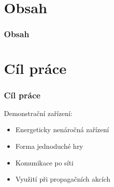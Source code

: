 \documentclass{beamer}
\author[\FirstNameAbbreviated. \LastName]{\FirstName{} \LastName \\ {\color{mygray}\Email}}
\title{\DissertationTitle}
\institute[\FacultyAndUniversityAbbr]{\Department\\ \Faculty\\ \University \\[1em]}
\date{\today}
\begin{document}
{
\beamertemplatenavigationsymbolsempty
\begin{frame}[plain]
\maketitle
\end{frame}
\addtocounter{framenumber}{-1}
}
%
\section*{Obsah}
\begin{frame}[allowframebreaks]
\frametitle{Obsah}
\tableofcontents
\end{frame}

\section{Cíl práce}
\begin{frame}
\frametitle{Cíl práce}
Demonstrační zařízení:
\begin{itemize}
\item Energeticky nenáročná zařízení
\item Forma jednoduché hry
\item Komunikace po síti 
\item Využití při propagačních akcích
\end{itemize}
\end{frame}
\end{document}
